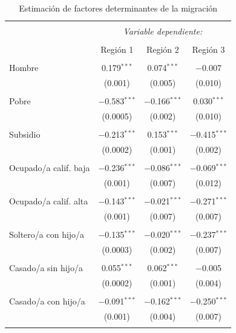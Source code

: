 \documentclass[12pt,a4paper]{article}
\begin{document}
\begin{table}[!htbp] \centering \footnotesize 
  \caption{Estimación de factores determinantes de la migración} 
  \label{cuadro:estimacion} 
\begin{tabular}{@{\extracolsep{5pt}}lccc} 
\\[-1.8ex]\hline 
\hline \\[-1.8ex] 
 & \multicolumn{3}{c}{\textit{Variable dependiente:}} \\ 
\cline{2-4} 
\\[-1.8ex] & Región 1 & Región 2 & Región 3 \\ 
\hline \\[-1.8ex] 
 Hombre & 0.179$^{***}$ & 0.074$^{***}$ & $-$0.007 \\ 
  & (0.001) & (0.005) & (0.010) \\ 
  & & & \\ 
 Pobre & $-$0.583$^{***}$ & $-$0.166$^{***}$ & 0.030$^{***}$ \\ 
  & (0.0005) & (0.002) & (0.010) \\ 
  & & & \\ 
 Subsidio & $-$0.213$^{***}$ & 0.153$^{***}$ & $-$0.415$^{***}$ \\ 
  & (0.0002) & (0.001) & (0.002) \\ 
  & & & \\ 
 Ocupado/a calif. baja & $-$0.236$^{***}$ & $-$0.086$^{***}$ & $-$0.069$^{***}$ \\ 
  & (0.001) & (0.007) & (0.012) \\ 
  & & & \\ 
 Ocupado/a calif. alta  & $-$0.143$^{***}$ & $-$0.021$^{***}$ & $-$0.271$^{***}$ \\ 
  & (0.001) & (0.007) & (0.007) \\ 
  & & & \\ 
 Soltero/a con hijo/a & $-$0.135$^{***}$ & $-$0.020$^{***}$ & $-$0.237$^{***}$ \\ 
  & (0.0003) & (0.002) & (0.007) \\ 
  & & & \\ 
 Casado/a sin hijo/a & 0.055$^{***}$ & 0.062$^{***}$ & $-$0.005 \\ 
  & (0.0002) & (0.001) & (0.004) \\ 
  & & & \\ 
 Casado/a con hijo/a & $-$0.091$^{***}$ & $-$0.162$^{***}$ & $-$0.250$^{***}$ \\ 
  & (0.001) & (0.004) & (0.007) \\ 
  & & & \\ 

\end{tabular}
\end{table}
\end{document}
